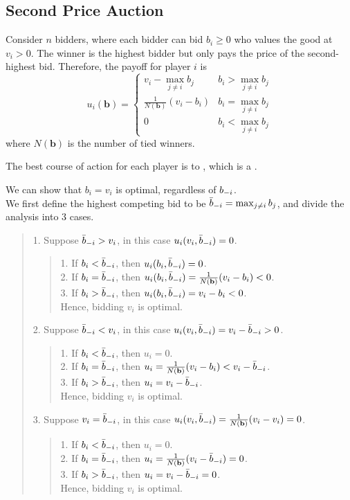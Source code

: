 \subsection{Second Price Auction}
Consider $n$ bidders, where each bidder can bid $b_i \ge 0$ who values the good at $v_i > 0$. The winner is the highest bidder but only pays the price of the second-highest bid. Therefore, the payoff for player $i$ is
$$u_i(\mathbf{b}) = \begin{cases}
    v_i - \max_{j \ne i} b_j & b_i > \max_{j \ne i} b_j \\
    \frac{1}{N(\mathbf{b})} (v_i - b_i) & b_i = \max_{j \ne i} b_j \\
    0 & b_i < \max_{j \ne i} b_j
\end{cases}$$
where $N(\mathbf{b})$ is the number of tied winners.
\begin{proposition}
    The best course of action for each player is to , which is a .
\end{proposition}
We can show that $b_i = v_i$ is optimal, regardless of $b_{-i}$. \\
We first define the highest competing bid to be $\bar{b}_{-i} = \max_{j \ne i}b_j$, and divide the analysis into $3$ cases.
\begin{quote}
    1. Suppose $\bar{b}_{-i} > v_i$, in this case $u_i(v_i, \bar{b}_{-i}) = 0$.
    \begin{quote}
        1. If $b_i < \bar{b}_{-i}$, then $u_i(b_i, \bar{b}_{-i}) = 0$. \\
        2. If $b_i = \bar{b}_{-i}$, then $u_i(b_i, \bar{b}_{-i}) = \frac{1}{N(\mathbf{b})}(v_i - b_i) < 0$. \\
        3. If $b_i > \bar{b}_{-i}$, then $u_i(b_i, \bar{b}_{-i}) = v_i - b_i < 0$. \\
        Hence, bidding $v_i$ is optimal.
    \end{quote}
    2. Suppose $\bar{b}_{-i} < v_i$, in this case $u_i(v_i, \bar{b}_{-i}) = v_i - \bar{b}_{-i} > 0$.
    \begin{quote}
        1. If $b_i < \bar{b}_{-i}$, then $u_i = 0$. \\
        2. If $b_i = \bar{b}_{-i}$, then $u_i = \frac{1}{N(\mathbf{b})}(v_i - b_i) < v_i - \bar{b}_{-i}$. \\
        3. If $b_i > \bar{b}_{-i}$, then $u_i = v_i - \bar{b}_{-i}$. \\
        Hence, bidding $v_i$ is optimal.
    \end{quote}
    3. Suppose $v_i =\bar{b}_{-i}$, in this case $u_i(v_i, \bar{b}_{-i}) = \frac{1}{N(\mathbf{b})}(v_i - v_i) = 0$.
    \begin{quote}
        1. If $b_i < \bar{b}_{-i}$, then $u_i = 0$. \\
        2. If $b_i = \bar{b}_{-i}$, then $u_i = \frac{1}{N(\mathbf{b})}(v_i - \bar{b}_{-i}) = 0$. \\
        3. If $b_i > \bar{b}_{-i}$, then $u_i = v_i - \bar{b}_{-i} = 0$. \\
        Hence, bidding $v_i$ is optimal.
    \end{quote}
\end{quote}

